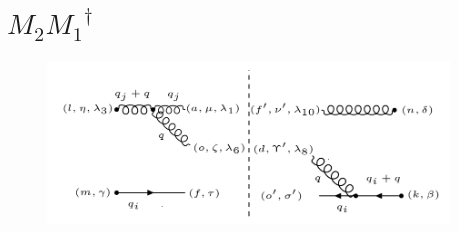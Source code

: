 \section{$M_2 {M_1}^{\dagger}$}
\begin{figure}[ht!]
\centering
\includegraphics[width=0.95\textwidth]{images/QGG/M2M1dagger.png}
\end{figure}
%
%
%
